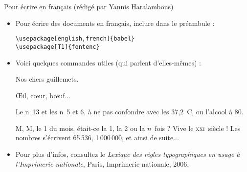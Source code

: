 \documentclass{beamer}
\begin{document}
\begin{frame}[fragile]{Pour écrire en français (rédigé par Yannis Haralambous)}
\small
\begin{itemize}
\item Pour écrire des documents en français, inclure dans le préambule :
\begin{verbatim}
\usepackage[english,french]{babel}
\usepackage[T1]{fontenc}
\end{verbatim}
\item Voici quelques commandes utiles (qui parlent d'elles-mêmes) :
\begin{exampletwouptiny}
Nos chers \og{}guillemets\fg{}.

{\OE}il, c{\oe}ur, b{\oe}uf...

Le n~13 et les n~5 et 6,
à ne pas confondre avec les
37,2~\textdegree C, ou l'alcool
à 80\textdegree.

M, M, le 1
du mois, était-ce la 1,
la 2 ou la $n$~fois ?
Vive le \textsc{xxi}~siècle !
Les nombres s'écrivent 65\,536,
1\,000\,000, et ainsi de suite...
\end{exampletwouptiny}
\item Pour plus d'infos, consultez le \emph{Lexique des règles typographiques en usage à l'Imprimerie nationale}, Paris, Imprimerie nationale, 2006.
\end{itemize}
\end{frame}
\end{document}
